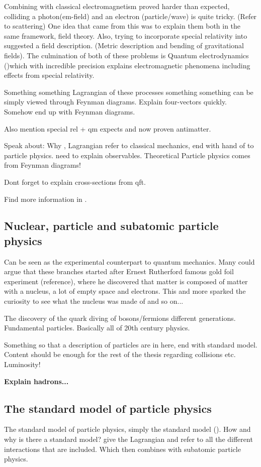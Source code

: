 Combining \abbrQM with classical electromagnetism proved harder than expected, colliding a photon(em-field) and an electron (particle/wave) is quite tricky. (Refer to scattering) One idea that came from this was to explain them both in the same framework, field theory.
Also, trying to incorporate special relativity into \abbrQM suggested a field description. (Metric description and bending of gravitational fields).
The culmination of both of these problems is Quantum electrodynamics (\abbrQED)which with incredible precision explains electromagnetic phenomena including effects from special relativity.\citep{Zee:2003}


Something something Lagrangian of these processes something something can be simply viewed through Feynman diagrams.
Explain four-vectors quickly.
Somehow end up with Feynman diagrams.

Also mention special rel + qm expects and now proven antimatter.

Speak about: Why \abbrQM, Lagrangian refer to classical mechanics, end with hand of to particle physics. need to explain observables.
Theoretical Particle physics comes from Feynman diagrams!

Dont forget to explain cross-sections from qft.

Find more information in \citep{Goldstein:2001,Bransden:2000, Zee:2003}.

\subsection{Nuclear, particle and subatomic particle physics}
Can be seen as the experimental counterpart to quantum mechanics.
Many could argue that these branches started after Ernest Rutherford famous gold foil experiment (reference), where he discovered that matter is composed of matter with a nucleus, a lot of empty space and electrons. This and more sparked the curiosity to see what the nucleus was made of and so on... 

The discovery of the quark diving of bosons/fermions different generations. Fundamental particles. Basically all of 20th century physics. 

Something so that a description of particles are in here, end with standard model.
Content should be enough for the rest of the thesis regarding collisions etc.
Luminosity!

\textbf{Explain hadrons...}

\subsection{The standard model of particle physics} 
The standard model of particle physics, simply the standard model (\abbrSM).
How and why is there a standard model? give the Lagrangian and refer to all the different interactions that are included. Which then combines \abbrQM with subatomic particle physics.
 
